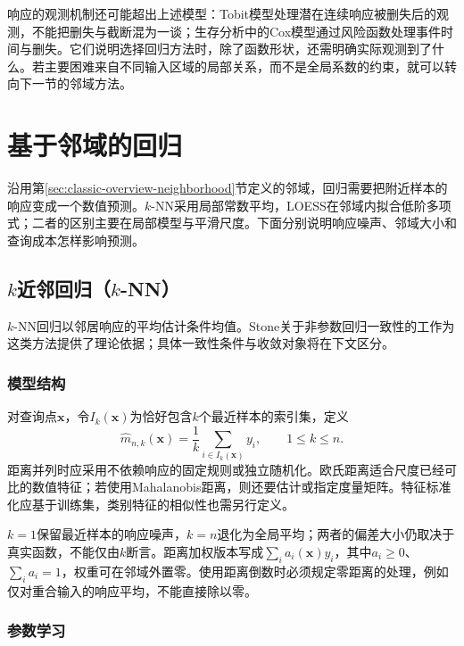 响应的观测机制还可能超出上述模型：Tobit模型处理潜在连续响应被删失后的观测，不能把删失与截断混为一谈；生存分析中的Cox模型通过风险函数处理事件时间与删失。它们说明选择回归方法时，除了函数形状，还需明确实际观测到了什么。若主要困难来自不同输入区域的局部关系，而不是全局系数的约束，就可以转向下一节的邻域方法。

\section{基于邻域的回归}
\label{sec:regression-instance}

沿用第\ref{sec:classic-overview-neighborhood}节定义的邻域，回归需要把附近样本的响应变成一个数值预测。$k$-NN采用局部常数平均，LOESS在邻域内拟合低阶多项式；二者的区别主要在局部模型与平滑尺度。下面分别说明响应噪声、邻域大小和查询成本怎样影响预测。

\subsection{$k$近邻回归（$k$-NN）}
\label{sec:regression-knn}

$k$-NN回归以邻居响应的平均估计条件均值。Stone关于非参数回归一致性的工作为这类方法提供了理论依据；具体一致性条件与收敛对象将在下文区分。

\subsubsection{模型结构}

对查询点$\bm{x}$，令$I_k(\bm{x})$为恰好包含$k$个最近样本的索引集，定义
\begin{equation}
  \widehat m_{n,k}(\bm{x})=\frac1k\sum_{i\in I_k(\bm{x})}y_i,
  \qquad 1\leq k\leq n.
  \label{eq:regression-knn}
\end{equation}
距离并列时应采用不依赖响应的固定规则或独立随机化。欧氏距离适合尺度已经可比的数值特征；若使用Mahalanobis距离，则还要估计或指定度量矩阵。特征标准化应基于训练集，类别特征的相似性也需另行定义。

$k=1$保留最近样本的响应噪声，$k=n$退化为全局平均；两者的偏差大小仍取决于真实函数，不能仅由$k$断言。距离加权版本写成$\sum_i a_i(\bm{x})y_i$，其中$a_i\geq0$、$\sum_i a_i=1$，权重可在邻域外置零。使用距离倒数时必须规定零距离的处理，例如仅对重合输入的响应平均，不能直接除以零。

\subsubsection{参数学习}

